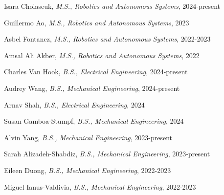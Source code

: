\documentclass[letterpaper]{deedy-resume} %
\begin{document}
{}

\begin{etaremune}[itemsep=0.02cm]

\item Isara Cholaseuk, {\it M.S., Robotics and Autonomous Systems}, 2024-present

\item Guillermo Ao, {\it M.S., Robotics and Autonomous Systems}, 2023

\item Asbel Fontanez, {\it M.S., Robotics and Autonomous Systems}, 2022-2023

\item Amsal Ali Akber, {\it M.S., Robotics and Autonomous Systems}, 2022

\end{etaremune}

{}

\begin{etaremune}[itemsep=0.02cm]

\item Charles Van Hook, {\it B.S., Electrical Engineering}, 2024-present

\item Audrey Wang, {\it B.S., Mechanical Engineering}, 2024-present

\item Arnav Shah, {\it B.S., Electrical Engineering}, 2024

\item Susan Gamboa-Stumpf, {\it B.S., Mechanical Engineering}, 2024

\item Alvin Yang, {\it B.S., Mechanical Engineering}, 2023-present

\item Sarah Alizadeh-Shabdiz, {\it B.S., Mechanical Engineering}, 2023-present

\item Eileen Duong, {\it B.S., Mechanical Engineering}, 2022-2023

\item Miguel Ianus-Valdivia, {\it B.S., Mechanical Engineering}, 2022-2023

\end{etaremune}


\end{document}
